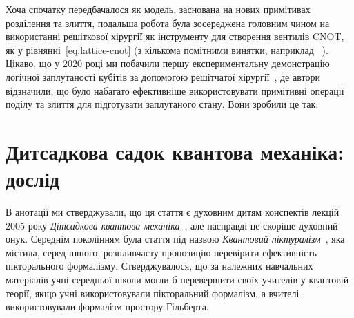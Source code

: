 \documentclass[11pt]{article}
\theoremstyle{definition}
\begin{document}
{Хоча спочатку передбачалося як модель, заснована на нових примітивах розділення та злиття, подальша робота була зосереджена головним чином на використанні решіткової хірургії як інструменту для створення вентилів CNOT, як у рівнянні~\eqref{eq:lattice-cnot} (з кількома помітними винятки, наприклад ~\cite{Litinski2019gameofsurfacecodes}). Цікаво, що у 2020 році ми побачили першу експериментальну демонстрацію логічної заплутаності кубітів за допомогою решітчатої хірургії~\cite[\textit{Nature}]{LatticeSurgeryNature}, де автори відзначили, що було набагато ефективніше використовувати примітивні операції поділу та злиття для підготувати заплутаного стану. Вони зробили це так:



\section{Дитсадкова садок квантова механіка: дослід}\label{sec:exp}

В анотації ми стверджували, що ця стаття є духовним дитям конспектів лекцій 2005 року \textit{Дітсадкова квантова механіка}~\cite{Kindergarten}, але насправді це скоріше духовний онук. Середнім поколінням була стаття під назвою \textit{Квантовий піктуралізм}~\cite{ContPhys}, яка містила, серед іншого, розпливчасту пропозицію перевірити ефективність пікторального формалізму. Стверджувалося, що за належних навчальних матеріалів учні середньої школи могли б перевершити своїх учителів у квантовій теорії, якщо учні використовували пікторальний формалізм, а вчителі використовували формалізм простору Гільберта.

}
\end{document}
